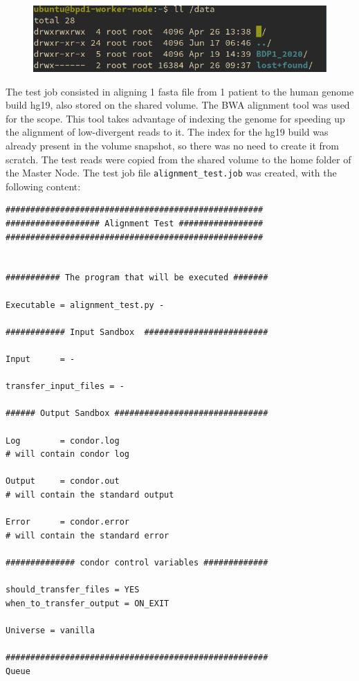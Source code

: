 \documentclass{article}
\begin{document}
\begin{figure}[!h]
	\center
	\includegraphics[width=.8\textwidth]{./images/nfs_bdp_works.png}
\end{figure}

The test job consisted in aligning 1 fasta file from 1 patient to the human genome build hg19, also stored on the shared volume.
The BWA alignment tool was used for the scope.
This tool takes advantage of indexing the genome for speeding up the alignment of low-divergent reads to it.
The index for the hg19 build was already present in the volume snapshot, so there was no need to create it from scratch.
The test reads were copied from the shared volume to the home folder of the Master Node.
The test job file \texttt{alignment\_test.job} was created, with the following content:

\begin{lstlisting}
####################################################
################### Alignment Test #################
####################################################


########### The program that will be executed #######

Executable = alignment_test.py -

############ Input Sandbox  #########################

Input      = -

transfer_input_files = -

###### Output Sandbox ###############################

Log        = condor.log
# will contain condor log

Output     = condor.out
# will contain the standard output

Error      = condor.error
# will contain the standard error

############## condor control variables #############

should_transfer_files = YES
when_to_transfer_output = ON_EXIT

Universe = vanilla

#####################################################
Queue

\end{lstlisting}
\pagebreak
\end{document}
